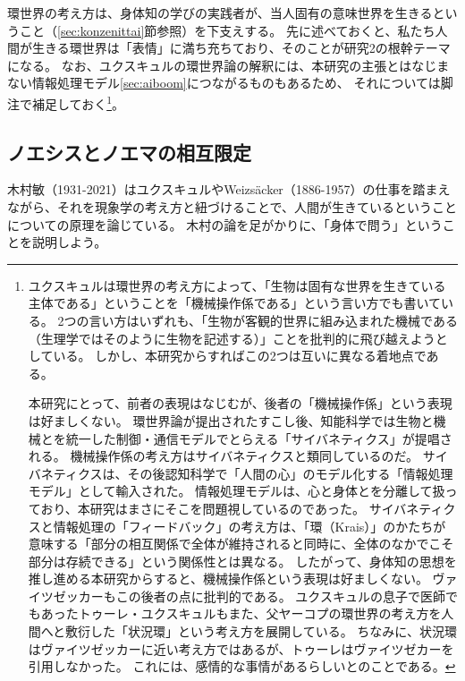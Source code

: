 環世界の考え方は、身体知の学びの実践者が、当人固有の意味世界を生きるということ（\ref{sec:konzenittai}節参照）を下支えする。
先に述べておくと、私たち人間が生きる環世界は「表情」に満ち充ちており\cite{hiromatsu:1989}、そのことが研究2の根幹テーマになる。
なお、ユクスキュルの環世界論の解釈には、本研究の主張とはなじまない情報処理モデル\ref{sec:aiboom}につながるものもあるため、
それについては脚注で補足しておく\footnote{
  ユクスキュルは環世界の考え方によって、「生物は固有な世界を生きている主体である」ということを「機械操作係である」という言い方でも書いている。
2つの言い方はいずれも、「生物が客観的世界に組み込まれた機械である（生理学ではそのように生物を記述する）」ことを批判的に飛び越えようとしている。
しかし、本研究からすればこの2つは互いに異なる着地点である。

本研究にとって、前者の表現はなじむが、後者の「機械操作係」という表現は好ましくない。
環世界論が提出されたすこし後、知能科学では生物と機械とを統一した制御・通信モデルでとらえる「サイバネティクス\cite{wiener:1948}」が提唱される。
機械操作係の考え方はサイバネティクスと類同しているのだ。
サイバネティクスは、その後認知科学で「人間の心」のモデル化する「情報処理モデル」として輸入された。
情報処理モデルは、心と身体とを分離して扱っており、本研究はまさにそこを問題視しているのであった。
サイバネティクスと情報処理の「フィードバック」の考え方は、「環（Krais）」のかたちが意味する「部分の相互関係で全体が維持されると同時に、全体のなかでこそ部分は存続できる」という関係性とは異なる。
したがって、身体知の思想を推し進める本研究からすると、機械操作係という表現は好ましくない。
ヴァイツゼッカーもこの後者の点に批判的である。
ユクスキュルの息子で医師でもあったトゥーレ・ユクスキュルもまた、父ヤーコプの環世界の考え方を人間へと敷衍した「状況環」という考え方を展開している。
ちなみに、状況環はヴァイツゼッカーに近い考え方ではあるが、トゥーレはヴァイツゼカーを引用しなかった。
これには、感情的な事情があるらしいとのことである。
}。

\subsection{ノエシスとノエマの相互限定}
\label{subsec:noesisnoema}
木村敏（1931-2021）はユクスキュルやWeizsäcker（1886-1957）の仕事を踏まえながら、それを現象学の考え方と紐づけることで、人間が生きているということについての原理を論じている。
木村の論を足がかりに、「身体で問う」ということを説明しよう。

